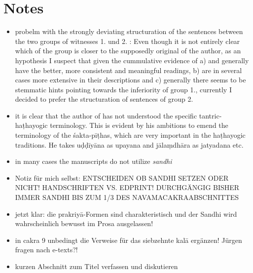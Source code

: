 \documentclass[11pt,showtrims]{memoir}
\begin{document}
\section{Notes}
\begin{itemize}
\item probelm with the strongly deviating structuration of the sentences between the two groups of witnesses 1. \edprint \pune \lalchand \oxford und 2. \nepal \unbekannt: Even though it is not entirely clear which of the group is closer to the supposedly original of the author, as an hypothesis I suspect that given the cummulative evidence of a) \nepal and \unbekannt generally have the better, more consistent and meaningful readings, b) are in several cases more extensive in their descriptions and c) generally there seems to be stemmatic hints pointing towards the inferiority of group 1., currently I decided to prefer the structuration of sentences of group 2.
\item it is clear that the author of \edprint has not understood the specific tantric-haṭhayogic terminology. This is evident by his ambitions to emend the terminology of the śakta-pīṭhas, which are very important in the haṭhayogic traditions. He takes uḍḍīyāna as upayana and jālaṃdhāra as jatyadana etc.
\item in many cases the manuscripts do not utilize \textit{sandhi}
\item Notiz für mich selbst: ENTSCHEIDEN OB SANDHI SETZEN ODER NICHT! HANDSCHRIFTEN VS. EDPRINT! DURCHGÄNGIG BISHER IMMER SANDHI BIS ZUM 1/3 DES NAVAMACAKRAABSCHNITTES
\item jetzt klar: die prakriyā-Formen sind charakteristisch und der Sandhi wird wahrscheinlich bewusst im Prosa ausgelassen!
\item in cakra 9 unbedingt die Verweise für das siebzehnte kalā ergänzen! Jürgen fragen nach e-texts?!
\item kurzen Abschnitt zum Titel verfassen und diskutieren 
\end{itemize}
\end{document}
